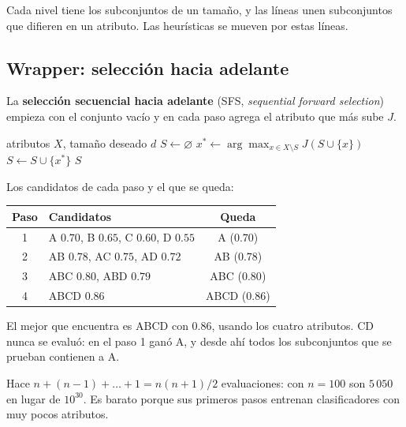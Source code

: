\documentclass[11pt,letterpaper]{article}
\begin{document}
Cada nivel tiene los subconjuntos de un tamaño, y las líneas unen
subconjuntos que difieren en un atributo. Las heurísticas se mueven por
estas líneas.


\subsection*{Wrapper: selección hacia adelante}

La \textbf{selección secuencial hacia adelante} (SFS,
\textit{sequential forward selection}) empieza con el conjunto vacío y
en cada paso agrega el atributo que más sube $J$.

\begin{algorithm}[H]
\caption{Selección hacia adelante}
\begin{algorithmic}[1]
\Require atributos $X$, tamaño deseado $d$
\State $S \gets \varnothing$
  \State $x^* \gets \arg\max_{x \in X \setminus S} J(S \cup \{x\})$
  \State $S \gets S \cup \{x^*\}$
\EndWhile
\State \Return $S$
\end{algorithmic}
\end{algorithm}

\begin{ejemplo}
    Los candidatos de cada paso y el que se queda:
    \begin{center}
    \small
    \begin{tabular}{clc}
        \toprule
        \textbf{Paso} & \textbf{Candidatos} & \textbf{Queda} \\
        \midrule
        1 & A $0.70$, B $0.65$, C $0.60$, D $0.55$ & A ($0.70$) \\
        2 & AB $0.78$, AC $0.75$, AD $0.72$ & AB ($0.78$) \\
        3 & ABC $0.80$, ABD $0.79$ & ABC ($0.80$) \\
        4 & ABCD $0.86$ & ABCD ($0.86$) \\
        \bottomrule
    \end{tabular}
    \end{center}
    El mejor que encuentra es ABCD con $0.86$, usando los cuatro
    atributos. CD nunca se evaluó: en el paso 1 ganó A, y desde ahí
    todos los subconjuntos que se prueban contienen a A.
\end{ejemplo}

Hace $n + (n - 1) + \dots + 1 = n(n+1)/2$ evaluaciones: con
$n = 100$ son $5\,050$ en lugar de $10^{30}$. Es barato porque sus
primeros pasos entrenan clasificadores con muy pocos atributos.
\end{document}
